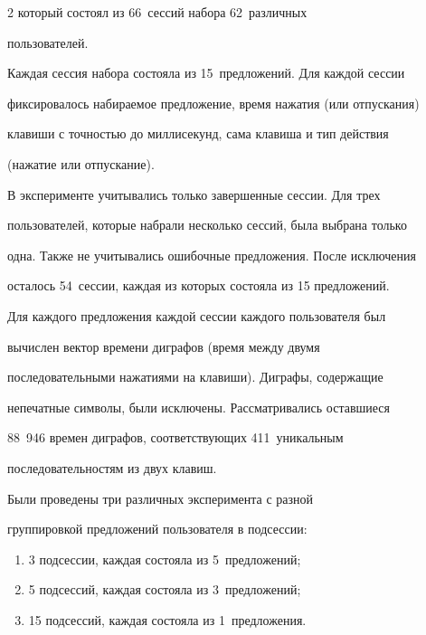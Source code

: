 \begin{multicols}{2}
который состоял из 66~сессий набора 62~различных

пользователей.



Каждая сессия набора состояла из 15~предложений. Для каждой сессии

фиксировалось на\-би\-ра\-емое предложение, время нажатия (или отпускания)

клавиши с точностью до миллисекунд, сама клавиша и тип действия

(нажатие или отпускание).



В эксперименте учитывались только завершенные сессии. Для трех

пользователей, которые набрали несколько сессий, была выбрана только

одна. Также не учитывались ошибочные предложения. После исключения

осталось 54~сессии, каждая из которых состояла из 15 предложений.



Для каждого предложения каждой сессии каж\-до\-го пользователя был

вычислен вектор времени диграфов (время между двумя

последовательными нажатиями на клавиши). Диграфы, содержащие

непечатные символы, были исключены. Рас\-смат\-ри\-ва\-лись оставшиеся

88~946 времен диграфов, соответствующих 411~уникальным

последовательностям из двух клавиш.



Были проведены три различных эксперимента с разной 

группировкой предложений пользователя в подсессии:


\begin{enumerate}[(1)]

    \item 3 подсессии, каждая состояла из 5~предложений;

    \item 5 подсессий, каждая состояла из 3~предложений;

    \item 15 подсессий, каждая состояла из 1~предложения.

\end{enumerate}


\end{multicols}
